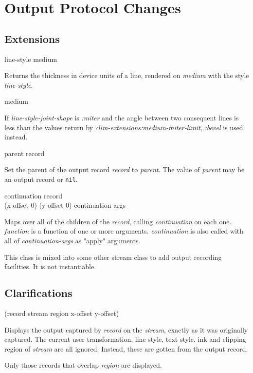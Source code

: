 \chapter{Output Protocol Changes}

\section{Extensions}

 {line-style medium\\}

Returns the thickness in device units of a line,
rendered on \textit{medium} with the style \textit{line-style}.


 {medium}

If \textit{line-style-joint-shape} is \textit{:miter} and the angle
between two consequent lines is less than the values return by
\textit{clim-extensions:medium-miter-limit}, \textit{:bevel} is used instead.


 {parent record}

Set the parent of the output record \textit{record}
to \textit{parent}.  The value of \textit{parent} may be an output
record or \texttt{nil}.


 {continuation record
\\\optional (x-offset 0) (y-offset 0) \rest continuation-args}

Maps over all of the children of the \textit{record}, calling
\textit{continuation} on each one. \textit{function} is a function of
one or more arguments. \textit{continuation} is also called with all
of \textit{continuation-args} as "apply" arguments.



This class is mixed into some other stream class to add output
recording facilities. It is not instantiable.

\section{Clarifications}
  {(record stream \optional region
  x-offset y-offset)\\}

Displays the output captured by \textit{record} on the
\textit{stream}, exactly as it was originally captured. The current
user transformation, line style, text style, ink and clipping region
of \textit{stream} are all ignored. Instead, these are gotten from the
output record.

Only those records that overlap \textit{region} are displayed.
